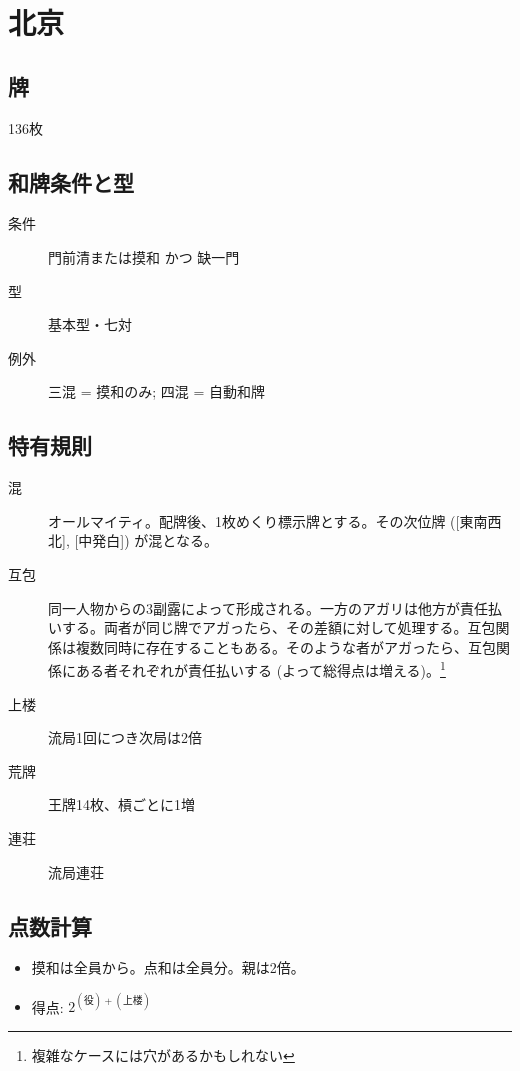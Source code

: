 \documentclass{ltjsarticle}
\begin{document}
\section{北京}
\subsection{牌}136枚
\subsection{和牌条件と型}
\begin{description}
    \item[条件] 門前清または摸和 かつ 缺一門
    \item[型] 基本型・七対
    \item[例外] 三混 = 摸和のみ; 四混 = 自動和牌
\end{description}
\subsection{特有規則}
\begin{description}
    \item[混] オールマイティ。配牌後、1枚めくり標示牌とする。その次位牌 ([東南西北], [中発白]) が混となる。
    \item[互包] 同一人物からの3副露によって形成される。一方のアガリは他方が責任払いする。両者が同じ牌でアガったら、その差額に対して処理する。互包関係は複数同時に存在することもある。そのような者がアガったら、互包関係にある者それぞれが責任払いする (よって総得点は増える)。\footnote{複雑なケースには穴があるかもしれない}
    \item[上楼] 流局1回につき次局は2倍
    \item[荒牌] 王牌14枚、槓ごとに1増
    \item[連荘] 流局連荘
\end{description}
\subsection{点数計算}
\begin{itemize}
    \item 摸和は全員から。点和は全員分。親は2倍。
    \item 得点: $2^{(\text{役})+(\text{上楼})}$
\end{itemize}
\end{document}
